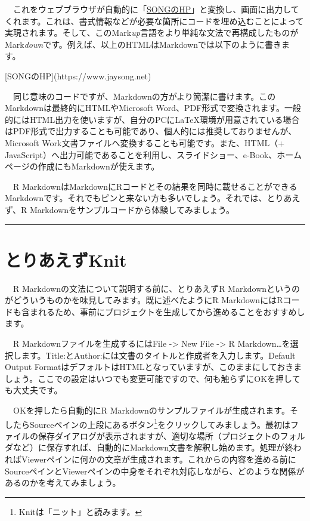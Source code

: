 \documentclass[
  a4paper,
  pandoc,
  ja=standard,
  jafont=haranoaji]{bxjsbook}
\newenvironment{Shaded}{\begin{snugshade}}{\end{snugshade}}
\newcommand{\CommentTok}[1]{\textcolor[rgb]{0.37,0.37,0.37}{#1}}
\newcommand{\OtherTok}[1]{\textcolor[rgb]{0.00,0.48,0.65}{#1}}
\begin{document}
　これをウェブブラウザが自動的に「\href{https://www.jaysong.net}{SONGのHP}」と変換し、画面に出力してくれます。これは、書式情報などが必要な箇所にコードを埋め込むことによって実現されます。そして、このMark\emph{up}言語をより単純な文法で再構成したものがMark\emph{down}です。例えば、以上のHTMLはMarkdownでは以下のように書きます。

\begin{Shaded}
\begin{Highlighting}[]
\CommentTok{[}\OtherTok{SONGのHP}\CommentTok{](https://www.jaysong.net)}
\end{Highlighting}
\end{Shaded}

　同じ意味のコードですが、Markdownの方がより簡潔に書けます。このMarkdownは最終的にHTMLやMicrosoft
Word、PDF形式で変換されます。一般的にはHTML出力を使いますが、自分のPCにLaTeX環境が用意されている場合はPDF形式で出力することも可能であり、個人的には推奨しておりませんが、Microsoft
Work文書ファイルへ変換することも可能です。また、HTML（+
JavaScript）へ出力可能であることを利用し、スライドショー、e-Book、ホームページの作成にもMarkdownが使えます。

　R
MarkdownはMarkdownにRコードとその結果を同時に載せることができるMarkdownです。それでもピンと来ない方も多いでしょう。それでは、とりあえず、R
Markdownをサンプルコードから体験してみましょう。

\begin{center}\rule{0.5\linewidth}{0.5pt}\end{center}

\hypertarget{ux3068ux308aux3042ux3048ux305aknit}{%
\section{とりあえずKnit}\label{ux3068ux308aux3042ux3048ux305aknit}}

　R Markdownの文法について説明する前に、とりあえずR
Markdownというのがどういうものかを味見してみます。既に述べたようにR
MarkdownにはRコードも含まれるため、事前にプロジェクトを生成してから進めることをおすすめします。

　R Markdownファイルを生成するにはFile -\textgreater{} New File
-\textgreater{} R
Markdown\ldots を選択します。Title:とAuthor:には文書のタイトルと作成者を入力します。Default
Output
FormatはデフォルトはHTMLとなっていますが、このままにしておきましょう。ここでの設定はいつでも変更可能ですので、何も触らずにOKを押しても大丈夫です。

　OKを押したら自動的にR
Markdownのサンプルファイルが生成されます。そしたらSourceペインの上段にあるボタン\footnote{Knitは「ニット」と読みます。}をクリックしてみましょう。最初はファイルの保存ダイアログが表示されますが、適切な場所（プロジェクトのフォルダなど）に保存すれば、自動的にMarkdown文書を解釈し始めます。処理が終わればViewerペインに何かの文章が生成されます。これからの内容を進める前にSourceペインとViewerペインの中身をそれぞれ対応しながら、どのような関係があるのかを考えてみましょう。
\end{document}
